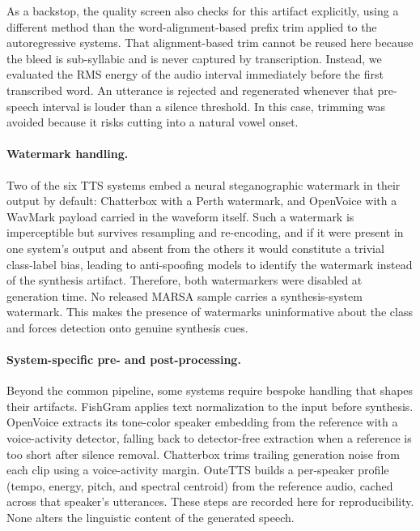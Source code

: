\documentclass[11pt]{article}
\begin{document}
As a backstop, the quality screen also checks for this artifact
explicitly, using a different method than the word-alignment-based
prefix trim applied to the autoregressive systems. That alignment-based
trim cannot be reused here because the bleed is sub-syllabic and is
never captured by transcription. Instead, we evaluated the RMS
energy of the audio interval immediately before the first transcribed
word. An utterance is rejected and regenerated whenever that pre-speech interval is louder than a silence threshold. In this case, trimming was avoided because it risks cutting into a natural vowel onset.


 
\paragraph{Watermark handling.} Two of the six TTS systems embed a neural
steganographic watermark in their output by default: Chatterbox with a
Perth watermark, and OpenVoice with a WavMark payload carried in the
waveform itself. Such a watermark is imperceptible but survives
resampling and re-encoding, and if it were present in one system's
output and absent from the others it would constitute a trivial
class-label bias, leading to anti-spoofing models to identify the watermark instead of the synthesis artifact. 
Therefore, both watermarkers were disabled at
generation time. No released MARSA sample carries a synthesis-system
watermark. This makes the presence of watermarks uninformative about
the class and forces detection onto genuine synthesis cues.



\paragraph{System-specific pre- and post-processing.} Beyond the common
pipeline, some systems require bespoke handling that shapes their
artifacts. FishGram applies text normalization to the input before
synthesis. OpenVoice extracts its tone-color speaker embedding from the
reference with a voice-activity detector, falling back to
detector-free extraction when a reference is too short after silence
removal. Chatterbox trims trailing generation noise from each clip using
a voice-activity margin. OuteTTS builds a per-speaker profile (tempo,
energy, pitch, and spectral centroid) from the reference audio, cached
across that speaker's utterances. These steps are recorded here for
reproducibility. None alters the linguistic content of the generated
speech.
\end{document}
